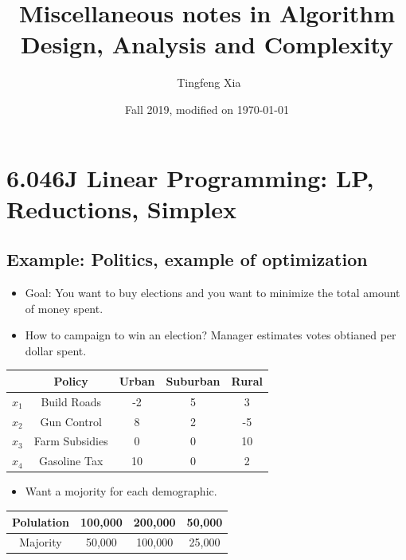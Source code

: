 \documentclass[10pt]{article}
\title{Miscellaneous notes in Algorithm Design, Analysis and Complexity}
\author{\ccLogo \,\,Tingfeng Xia}
\date{Fall 2019, modified on \today}
\begin{document}
\maketitle
\doclicenseThis
\tableofcontents
\newpage

\section{6.046J Linear Programming: LP, Reductions, Simplex}
\subsection{Example: Politics, example of optimization}
\begin{itemize}
    \item Goal: You want to buy elections and you want to minimize the total amount of money spent. 
    \item How to campaign to win an election? Manager estimates votes obtianed per dollar spent.
\end{itemize}
\begin{center}
    \begin{tabular}{|c|c||c|c|c|}
        \hline
         & Policy & Urban & Suburban & Rural \\
        \hline
        \hline
        $x_1$ & Build Roads & -2 & 5 & 3 \\
        \hline
        $x_2$ & Gun Control & 8 & 2 & -5 \\
        \hline
        $x_3$ & Farm Subsidies & 0 & 0 & 10 \\
        \hline
        $x_4$ & Gasoline Tax & 10 & 0 & 2 \\
        \hline
    \end{tabular}
\end{center}
\begin{itemize}
    \item Want a mojority for each demographic. 
\end{itemize}
\begin{center}
    \begin{tabular}{|c||c|c|c|}
        \hline
        Polulation & 100,000 & 200,000 & 50,000 \\
        \hline
        Majority & 50,000 & 100,000 & 25,000 \\
        \hline
    \end{tabular}
\end{center}
\end{document}
